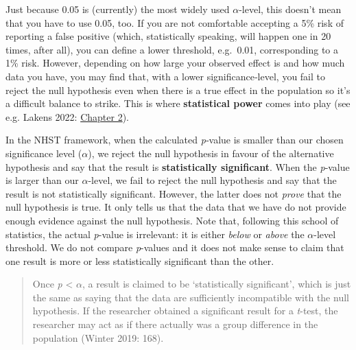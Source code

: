 \documentclass[
  letterpaper,
  DIV=11,
  numbers=noendperiod]{scrreprt}
\begin{document}
\begin{tcolorbox}[enhanced jigsaw, arc=.35mm, bottomrule=.15mm, bottomtitle=1mm, breakable, colback=white, colbacktitle=quarto-callout-important-color!10!white, colframe=quarto-callout-important-color-frame, coltitle=black, left=2mm, leftrule=.75mm, opacityback=0, opacitybacktitle=0.6, rightrule=.15mm, title=\textcolor{quarto-callout-important-color}{\faExclamation}\hspace{0.5em}{No risk no fun?}, titlerule=0mm, toprule=.15mm, toptitle=1mm]

Just because 0.05 is (currently) the most widely used \(\alpha\)-level,
this doesn't mean that you have to use 0.05, too. If you are not
comfortable accepting a 5\% risk of reporting a false positive (which,
statistically speaking, will happen one in 20 times, after all), you can
define a lower threshold, e.g.~0.01, corresponding to a 1\% risk.
However, depending on how large your observed effect is and how much
data you have, you may find that, with a lower significance‑level, you
fail to reject the null hypothesis even when there is a true effect in
the population so it's a difficult balance to strike. This is where
\textbf{statistical power} comes into play (see e.g. Lakens 2022:
\href{https://lakens.github.io/statistical_inferences/02-errorcontrol.html}{Chapter
2}).

\end{tcolorbox}

In the NHST framework, when the calculated \emph{p}‑value is smaller
than our chosen significance level (\(\alpha\)), we reject the null
hypothesis in favour of the alternative hypothesis and say that the
result is \textbf{statistically significant}. When the \emph{p}‑value is
larger than our \(\alpha\)-level, we fail to reject the null hypothesis
and say that the result is not statistically significant. However, the
latter does not \emph{prove} that the null hypothesis is true. It only
tells us that the data that we have do not provide enough evidence
against the null hypothesis. Note that, following this school of
statistics, the actual \emph{p}-value is irrelevant: it is either
\emph{below} or \emph{above} the \(\alpha\)-level threshold. We do not
compare \emph{p}-values and it does not make sense to claim that one
result is more or less statistically significant than the other.

\begin{quote}
Once \emph{p} \textless{} \(\alpha\), a result is claimed to be
`statistically significant', which is just the same as saying that the
data are sufficiently incompatible with the null hypothesis. If the
researcher obtained a significant result for a \emph{t}-test, the
researcher may act as if there actually was a group difference in the
population (Winter 2019: 168).
\end{quote}
\end{document}
